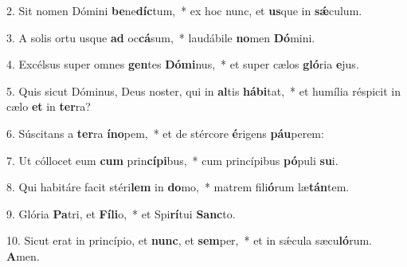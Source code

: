 2. Sit nomen Dómini \textbf{be}ne\textbf{díc}tum,~*  ex hoc nunc, et \textbf{us}que in \textbf{sǽ}culum.\

3. A solis ortu usque \textbf{ad} oc\textbf{cá}sum,~*  laudábile \textbf{no}men \textbf{Dó}mini.\

4. Excélsus super omnes \textbf{gen}tes \textbf{Dó}\textbf{mi}nus,~*  et super cælos \textbf{gló}ria \textbf{e}jus.\

5. Quis sicut Dóminus, Deus noster, qui in \textbf{al}tis \textbf{há}\textbf{bi}tat,~*  et humília réspicit in cælo \textbf{et} in \textbf{ter}ra?\

6. Súscitans a \textbf{ter}ra \textbf{ín}\textbf{o}pem,~*  et de stércore \textbf{é}rigens \textbf{páu}perem:\

7. Ut cóllocet eum \textbf{cum} prin\textbf{cí}\textbf{pi}bus,~*  cum princípibus \textbf{pó}puli \textbf{su}i.\

8. Qui habitáre facit stéri\textbf{lem} in \textbf{do}mo,~*  matrem fili\textbf{ó}rum læ\textbf{tán}tem.\

9. Glória \textbf{Pa}tri, et \textbf{Fí}\textbf{li}o,~*  et Spi\textbf{rí}tui \textbf{Sanc}to.\

10. Sicut erat in princípio, et \textbf{nunc}, et \textbf{sem}per,~*  et in sǽcula sæcu\textbf{ló}rum. \textbf{A}men.\

